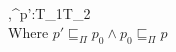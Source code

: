 \\[0.2cm]
		{\Gamma,\Pi\vdash  [\lambda\;x.e^{p}]^{p'}:T_1\rightarrow T_2}\\[0.3cm]
		Where $p'\sqsubseteq_\Pi p_0\wedge p_0\sqsubseteq_\Pi p$
